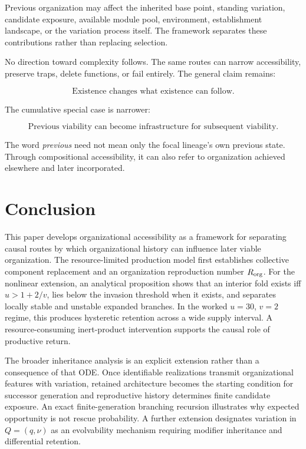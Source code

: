 \documentclass[11pt,a4paper]{article}
\begin{document}
Previous organization may affect the inherited base point, standing variation, candidate exposure, available module pool, environment, establishment landscape, or the variation process itself. The framework separates these contributions rather than replacing selection.

No direction toward complexity follows. The same routes can narrow accessibility, preserve traps, delete functions, or fail entirely. The general claim remains:

\[
\boxed{\text{Existence changes what existence can follow.}}
\]

The cumulative special case is narrower:

\[
\boxed{\text{Previous viability can become infrastructure for subsequent viability.}}
\]

The word \emph{previous} need not mean only the focal lineage's own previous state. Through compositional accessibility, it can also refer to organization achieved elsewhere and later incorporated.

\section{Conclusion}

This paper develops organizational accessibility as a framework for separating causal routes by which organizational history can influence later viable organization. The resource-limited production model first establishes collective component replacement and an organization reproduction number $R_{\rm org}$. For the nonlinear extension, an analytical proposition shows that an interior fold exists iff $u>1+2/v$, lies below the invasion threshold when it exists, and separates locally stable and unstable expanded branches. In the worked $u=30$, $v=2$ regime, this produces hysteretic retention across a wide supply interval. A resource-consuming inert-product intervention supports the causal role of productive return.

The broader inheritance analysis is an explicit extension rather than a consequence of that ODE. Once identifiable realizations transmit organizational features with variation, retained architecture becomes the starting condition for successor generation and reproductive history determines finite candidate exposure. An exact finite-generation branching recursion illustrates why expected opportunity is not rescue probability. A further extension designates variation in $Q=(q,\nu)$ as an evolvability mechanism requiring modifier inheritance and differential retention.
\end{document}
